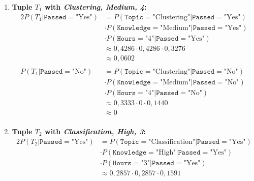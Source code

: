 \documentclass[
english,
smallborders
]{i6prcsht}
\newcommand{\Likelihood}[4]{P(\texttt{#1}=\text{"#2"} | \texttt{#3}=\text{"#4"})}
\newcommand{\LikelihoodTuple}[3]{P(#1 | \texttt{#2}=\text{"#3"})}
\begin{document}
\begin{solution}
\begin{enumerate}
		      \begin{enumerate}
			      \item \textbf{Tuple $T_1$ with \textit{Clustering, Medium, 4}:}
			            \begin{alignat*}{2}
				            \LikelihoodTuple{T_1}{Passed}{Yes} & =  \Likelihood{Topic}{Clustering}{Passed}{Yes}    \\
				                                               & \cdot \Likelihood{Knowledge}{Medium}{Passed}{Yes} \\
				                                               & \cdot \Likelihood{Hours}{4}{Passed}{Yes}          \\
				                                               & \approx 0,4286 \cdot 0,4286 \cdot 0,3276          \\
				                                               & \approx 0,0602                                    \\
				                                               &                                                   \\
				            \LikelihoodTuple{T_1}{Passed}{No}  & =  \Likelihood{Topic}{Clustering}{Passed}{No}     \\
				                                               & \cdot \Likelihood{Knowledge}{Medium}{Passed}{No}  \\
				                                               & \cdot \Likelihood{Hours}{4}{Passed}{No}           \\
				                                               & \approx  0,3333 \cdot 0 \cdot 0,1440              \\
				                                               & \approx 0                                         \\
			            \end{alignat*}
			      \item \textbf{Tuple $T_2$ with \textit{Classification, High, 3}:}
			            \begin{alignat*}{2}
				            \LikelihoodTuple{T_2}{Passed}{Yes} & =  \Likelihood{Topic}{Classification}{Passed}{Yes} \\
				                                               & \cdot \Likelihood{Knowledge}{High}{Passed}{Yes}    \\
				                                               & \cdot \Likelihood{Hours}{3}{Passed}{Yes}           \\
				                                               & \approx  0,2857 \cdot 0,2857 \cdot 0,1591          \\

\end{alignat*}
\end{enumerate}
\end{enumerate}
\end{solution}
\end{document}
